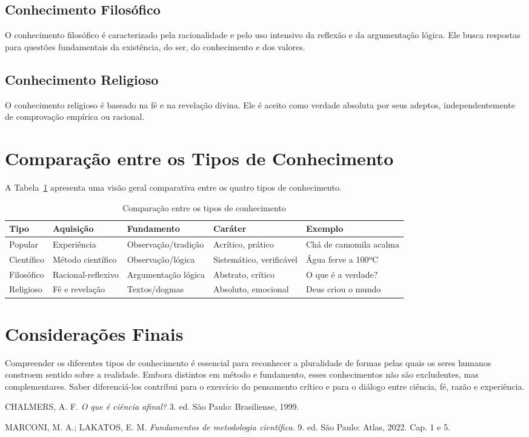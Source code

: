 \documentclass[10pt]{article}
\begin{document}
\subsection{Conhecimento Filosófico}
O conhecimento filosófico é caracterizado pela racionalidade e pelo uso intensivo da reflexão e da argumentação lógica. Ele busca respostas para questões fundamentais da existência, do ser, do conhecimento e dos valores.

\subsection{Conhecimento Religioso}
O conhecimento religioso é baseado na fé e na revelação divina. Ele é aceito como verdade absoluta por seus adeptos, independentemente de comprovação empírica ou racional.

\section{Comparação entre os Tipos de Conhecimento}
A Tabela~\ref{tab:comparacao} apresenta uma visão geral comparativa entre os quatro tipos de conhecimento.

\begin{table}[h!]
\centering
\begin{tabular}{|l|l|l|l|l|}
\hline
\textbf{Tipo} & \textbf{Aquisição} & \textbf{Fundamento} & \textbf{Caráter} & \textbf{Exemplo} \\ \hline
Popular & Experiência & Observação/tradição & Acrítico, prático & Chá de camomila acalma \\ \hline
Científico & Método científico & Observação/lógica & Sistemático, verificável & Água ferve a 100ºC \\ \hline
Filosófico & Racional-reflexivo & Argumentação lógica & Abstrato, crítico & O que é a verdade? \\ \hline
Religioso & Fé e revelação & Textos/dogmas & Absoluto, emocional & Deus criou o mundo \\ \hline
\end{tabular}
\caption{Comparação entre os tipos de conhecimento}
\label{tab:comparacao}
\end{table}

\section{Considerações Finais}
Compreender os diferentes tipos de conhecimento é essencial para reconhecer a pluralidade de formas pelas quais os seres humanos constroem sentido sobre a realidade. Embora distintos em método e fundamento, esses conhecimentos não são excludentes, mas complementares. Saber diferenciá-los contribui para o exercício do pensamento crítico e para o diálogo entre ciência, fé, razão e experiência.

\begin{thebibliography}{9}
CHALMERS, A. F. \textit{O que é ciência afinal?} 3. ed. São Paulo: Brasiliense, 1999.

MARCONI, M. A.; LAKATOS, E. M. \textit{Fundamentos de metodologia científica}. 9. ed. São Paulo: Atlas, 2022. Cap. 1 e 5.

\end{thebibliography}
\end{document}
